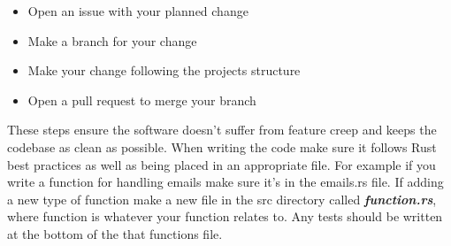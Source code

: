 \documentclass[12pt]{article}
\begin{document}
\begin{itemize}
    \item Open an issue with your planned change
    \item Make a branch for your change
    \item Make your change following the projects structure
    \item Open a pull request to merge your branch
\end{itemize}

These steps ensure the software doesn't suffer from feature creep and keeps the 
codebase as clean as possible. When writing the code make sure it follows Rust 
best practices as well as being placed in an appropriate file. For example if 
you write a function for handling emails make sure it's in the emails.rs file. 
If adding a new type of function make a new file in the src directory 
called \textbf{\textit{function.rs}}, where function is whatever your function 
relates to. Any tests should be written at the bottom of the that functions file.
\end{document}
